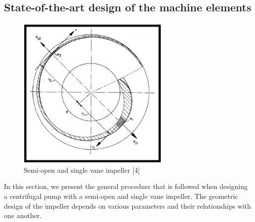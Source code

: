 \documentclass[11pt,a4paper]{scrartcl}
\begin{document}
\subsection{State-of-the-art design of the machine elements}
\begin{figure}[h]
    \centering
    \includegraphics[scale=0.8]{image4.png}
    \caption{Semi-open and single vane impeller [4]}
    
    \label{fig:image4}
    
\end{figure}

In this section, we present the general procedure that is followed when designing a centrifugal pump with a semi-open and single vane impeller. The geometric design of the impeller depends on various parameters and their relationships with one another. 
\end{document}
